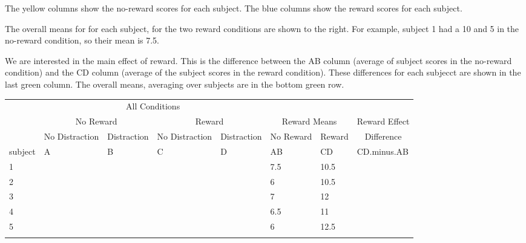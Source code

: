 \documentclass[
]{book}
\begin{document}
The yellow columns show the no-reward scores for each subject. The blue columns show the reward scores for each subject.

The overall means for for each subject, for the two reward conditions are shown to the right. For example, subject 1 had a 10 and 5 in the no-reward condition, so their mean is 7.5.

We are interested in the main effect of reward. This is the difference between the AB column (average of subject scores in the no-reward condition) and the CD column (average of the subject scores in the reward condition). These differences for each subjecct are shown in the last green column. The overall means, averaging over subjects are in the bottom green row.

\begin{table}
\centering
\begin{tabular}{l|>{}l|>{}l|>{}l|>{}l|l|l|>{}l}
\hline
\multicolumn{1}{c|}{ } & \multicolumn{4}{c|}{ All Conditions} & \multicolumn{3}{c}{ } \\
\cline{2-5}
\multicolumn{1}{c|}{ } & \multicolumn{2}{c|}{No Reward} & \multicolumn{2}{c|}{Reward} & \multicolumn{2}{c|}{ Reward Means } & \multicolumn{1}{c}{Reward Effect } \\
\cline{2-3} \cline{4-5} \cline{6-7} \cline{8-8}
\multicolumn{1}{c|}{ } & \multicolumn{1}{c|}{No Distraction} & \multicolumn{1}{c|}{Distraction} & \multicolumn{1}{c|}{No Distraction} & \multicolumn{1}{c|}{Distraction} & \multicolumn{1}{c|}{No Reward} & \multicolumn{1}{c|}{Reward} & \multicolumn{1}{c}{Difference} \\
\cline{2-2} \cline{3-3} \cline{4-4} \cline{5-5} \cline{6-6} \cline{7-7} \cline{8-8}
subject & A & B & C & D & AB & CD & CD.minus.AB\\
\hline
1 & \cellcolor{yellow}{10} & \cellcolor{yellow}{5} & \cellcolor{lightblue}{12} & \cellcolor{lightblue}{9} & 7.5 & 10.5 & \cellcolor{lightgreen}{3}\\
\hline
2 & \cellcolor{yellow}{8} & \cellcolor{yellow}{4} & \cellcolor{lightblue}{13} & \cellcolor{lightblue}{8} & 6 & 10.5 & \cellcolor{lightgreen}{4.5}\\
\hline
3 & \cellcolor{yellow}{11} & \cellcolor{yellow}{3} & \cellcolor{lightblue}{14} & \cellcolor{lightblue}{10} & 7 & 12 & \cellcolor{lightgreen}{5}\\
\hline
4 & \cellcolor{yellow}{9} & \cellcolor{yellow}{4} & \cellcolor{lightblue}{11} & \cellcolor{lightblue}{11} & 6.5 & 11 & \cellcolor{lightgreen}{4.5}\\
\hline
5 & \cellcolor{yellow}{10} & \cellcolor{yellow}{2} & \cellcolor{lightblue}{13} & \cellcolor{lightblue}{12} & 6 & 12.5 & \cellcolor{lightgreen}{6.5}\\
\hline
\cellcolor{lightgreen}{Means} & \cellcolor{lightgreen}{} & \cellcolor{lightgreen}{} & \cellcolor{lightgreen}{} & \cellcolor{lightgreen}{} & \cellcolor{lightgreen}{6.6} & \cellcolor{lightgreen}{11.3} & \cellcolor{lightgreen}{4.7}\\
\hline
\end{tabular}
\end{table}
\end{document}

